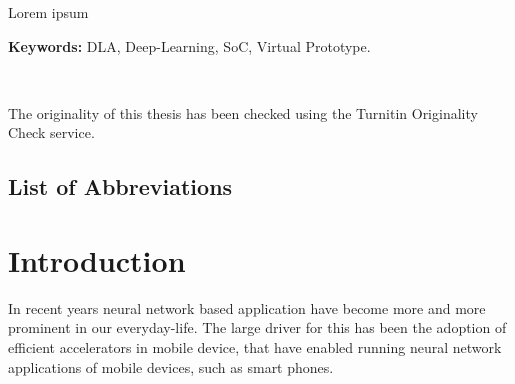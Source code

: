 \documentclass[12pt,a4paper,english
]{tunithesis}
\begin{document}
\vspace{0.5cm}


\noindent Lorem ipsum~

\noindent\textbf{Keywords:} DLA, Deep-Learning, SoC, Virtual Prototype.

~

\noindent The originality of this thesis has been checked using the Turnitin Originality Check service.


\clearpage

\section*{List of Abbreviations}
\begin{acronym}
\end{acronym}



\setcounter{tocdepth}{3}              %
\tableofcontents                      %

\if@twoside
\cleardoublepage
\fi


\renewcommand{\chaptername}{} %


\chapter{Introduction}
\label{ch:introduction}
\setcounter{page}{1} %

In recent years neural network based application have become more and more prominent in our everyday-life. The large driver for this has been the adoption of efficient accelerators in mobile device, that have enabled running neural network applications of mobile devices, such as smart phones.
\end{document}
